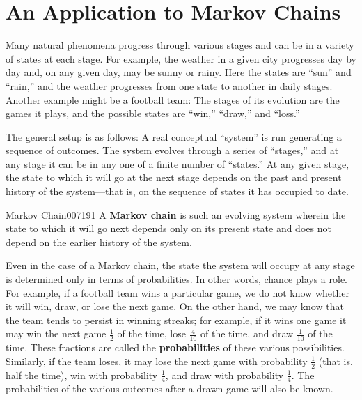 \section{An Application to Markov Chains}
\label{sec:2_9}

Many natural phenomena progress through various stages and can be in a variety of states at each stage. For example, the weather in a given city progresses day by day and, on any given day, may be sunny or rainy. Here the states are ``sun'' and ``rain,'' and the weather progresses from one state to another in daily stages. Another example might be a football team: The stages of its evolution are the games it plays, and the possible states are ``win,'' ``draw,'' and ``loss.''


The general setup is as follows: A real conceptual ``system'' is run generating a sequence of outcomes. The system evolves through a series of ``stages,'' and at any stage it can be in any one of a finite number of ``states.'' At any given stage, the state to which it will go at the next stage depends on the past and present history of the system---that is, on the sequence of states it has occupied to date.


\begin{definition}{Markov Chain}{007191}
A \textbf{Markov chain} is such an evolving system wherein the state to which it will go next depends only on its present state and does not depend on the earlier history of the system.\footnotemark 
\end{definition}

Even in the case of a Markov chain, the state the system will occupy at any stage is determined only in terms of probabilities. In other words, chance plays a role. For example, if a football team wins a particular game, we do not know whether it will win, draw, or lose the next game. On the other hand, we may know that the team tends to persist in winning streaks; for example, if it wins one game it may win the next game $\frac{1}{2}$ of the time, lose $\frac{4}{10}$ of the time, and draw $\frac{1}{10}$ of the time. These fractions are called the \textbf{probabilities} of these various possibilities. Similarly, if the team loses, it may lose the next game with probability $\frac{1}{2}$ (that is, half the time), win with probability $\frac{1}{4}$, and draw with probability $\frac{1}{4}$. The probabilities of the various outcomes after a drawn game will also be known.



